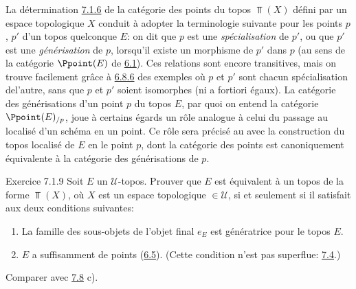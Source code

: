 \documentclass[10pt]{../fichiers-configuration-latex/smfart}
\begin{document}
\subsubsection{}
La détermination \hyperref[IV.subsubsec7.1.6]{7.1.6} de la catégorie des points
du topos $\Top(X)$ défini par un espace topologique $X$ conduit à
adopter la terminologie suivante pour les points $p$, $p'$ d'un
topos quelconque $E$: on dit que $p$ est une \emph{spécialisation}
de $p'$, ou que $p'$ est une \emph{générisation} de $p$, lorsqu'il
existe un morphisme de $p'$ dans $p$ (au sens de la catégorie
$\Ppoint(E)$ de \hyperref[IV.def6.1]{6.1}). Ces relations sont encore
transitives, mais on trouve facilement grâce à
\hyperref[IV.subsubsec6.8.6]{6.8.6} des exemples où $p$ et $p'$ sont chacun
spécialisation de\pageoriginale l'autre, sans que $p$ et $p'$ soient
isomorphes (ni a fortiori égaux). La catégorie des
générisations
d'un point $p$ du topos $E$, par quoi on entend la catégorie
$\Ppoint(E)_{/p}$, joue à certains égards un rôle analogue à celui
du passage au localisé d'un schéma en un point. Ce rôle sera
précisé
au  avec la construction du topos localisé de $E$ en le
point $p$, dont la catégorie des points est canoniquement
équivalente à la catégorie des générisations de $p$.

\begin{enonce*}[remark]{Exercice 7.1.9}
Soit $E$ un $𝒰$-topos. Prouver que $E$ est équivalent à un
topos de la forme $\Top(X)$, où $X$ est un espace topologique $\in
𝒰$, si et seulement si il satisfait aux deux conditions
suivantes:
\begin{enumerate}
\renewcommand{\theenumi}{\alph{enumi}}
\renewcommand{\labelenumi}{\theenumi)}
\item La famille des sous-objets de l'objet final $e_E$ est
génératrice pour le topos $E$.

\item $E$ a suffisamment de points (\hyperref[IV.prop6.5]{6.5}). (Cette condition n'est pas
superflue: \cf \hyperref[IV.subsec7.4]{7.4}.)
\end{enumerate}

Comparer avec \hyperref[IV.exer7.8]{7.8} c).
\end{enonce*}
\end{document}
